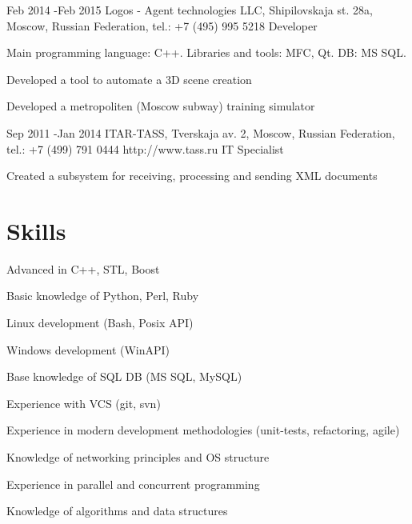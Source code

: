 \documentclass[10pt]{article} %
\begin{document}

\job
{Feb 2014 -}{Feb 2015}
{Logos - Agent technologies LLC, Shipilovskaja st. 28a, Moscow, Russian Federation, tel.: +7 (495) 995 5218}
{}
{Developer}
{
Main programming language: C++. Libraries and tools: MFC, Qt. DB: MS SQL.
\begin{itemize-noindent}
\setlength\itemsep{0em}
\item{Developed a tool to automate a 3D scene creation}
\item{Developed a metropoliten (Moscow subway) training simulator}
\end{itemize-noindent}
}


\job
{Sep 2011 -}{Jan 2014}
{ITAR-TASS, Tverskaja av. 2, Moscow, Russian Federation, tel.: +7 (499) 791 0444}
{http://www.tass.ru}
{IT Specialist}
{
\begin{itemize-noindent}
\setlength\itemsep{0em}
\item{Created a subsystem for receiving, processing and sending XML documents}
\end{itemize-noindent}
}


\section{Skills}

\begin{multicols}{2}
\begin{itemize-noindent}
\setlength\itemsep{0em}
\item Advanced in C++, STL, Boost
\item Basic knowledge of Python, Perl, Ruby
\item Linux development (Bash, Posix API)
\item Windows development (WinAPI)
\item Base knowledge of SQL DB (MS SQL, MySQL)
\item Experience with VCS (git, svn)
\item Experience in modern development methodologies (unit-tests, refactoring, agile)
\item Knowledge of networking principles and OS structure
\item Experience in parallel and concurrent programming
\item Knowledge of algorithms and data structures
\end{itemize-noindent}
\end{multicols}
\end{document}
